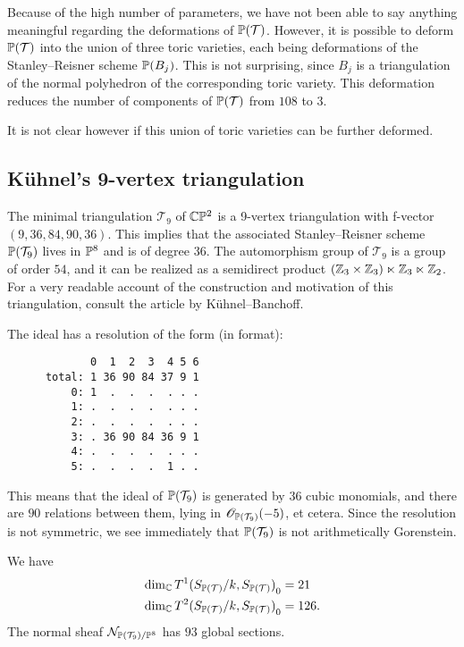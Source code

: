 Because of the high number of parameters, we have not been able to say anything meaningful regarding the deformations of $\P(\mathcal T)$. However, it is possible to deform $\P(\mathcal T)$ into the union of three toric varieties, each being deformations of the Stanley--Reisner scheme $\P(B_j)$. This is not surprising, since $B_j$ is a triangulation of the normal polyhedron of the corresponding toric variety. This deformation reduces the number of components of $\P(\mathcal T)$ from $108$ to $3$.

It is not clear however if this union of toric varieties can be further deformed.

\subsection{Kühnel's 9-vertex triangulation}

The minimal triangulation $\mathcal T_9$ of $\C \P^2$ is a 9-vertex triangulation with f-vector $(9,36,84,90,36)$. This implies that the associated Stanley--Reisner scheme $\P(\mathcal T_9)$ lives in $\P^8$ and is of degree $36$. The automorphism group of $\mathcal T_9$ is a group of order $54$, and it can be realized as a semidirect product $(\Z_3 \times \Z_3) \ltimes \Z_3 \ltimes \Z_2$. For a very readable account of the construction and motivation of this triangulation, consult the article \cite{kuhnel_9vertex} by Kühnel--Banchoff.

The ideal has a resolution of the form (in \MM format):

\begin{verbatim}
             0  1  2  3  4 5 6
      total: 1 36 90 84 37 9 1
          0: 1  .  .  .  . . .
          1: .  .  .  .  . . .
          2: .  .  .  .  . . .
          3: . 36 90 84 36 9 1
          4: .  .  .  .  . . .
          5: .  .  .  .  1 . .
\end{verbatim}

This means that the ideal of $\P(\mathcal T_9)$ is generated by $36$ cubic monomials, and there are $90$ relations between them, lying in $\OO_{\P(\mathcal T_9)}(-5)$, et cetera. Since the resolution is not symmetric, we see immediately that $\P(\mathcal T_9)$ is not arithmetically Gorenstein.

\begin{proposition}
We have
\begin{align*}
\dim_\C  {T^1(S_{\P(\mathcal T)}/k, S_{\P(\mathcal T)})}_0 &=  21 \\
\dim_\C  {T^2(S_{\P(\mathcal T)}/k, S_{\P(\mathcal T)})}_0 &= 126.
\end{align*}
The normal sheaf $\mathcal N_{\P(\mathcal T_9)/\P^{8}}$ has $93$ global sections.

\end{proposition}

